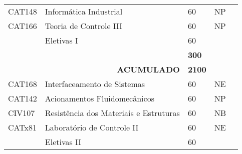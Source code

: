 \begin{table}[]
{\begin{tabular}{l|l|l|l|l}
			\multicolumn{1}{|l|}{CAT148}                        & Informática Industrial                                   & 60                                                           & NP                      &  \\ \cline{1-4}
			\multicolumn{1}{|l|}{CAT166}                        & Teoria de Controle III                                   & 60                                                           & NP                      &  \\ \cline{1-4}
			\multicolumn{1}{|l|}{{\color[HTML]{009901} }}       & {\color[HTML]{009901} Eletivas I}                        & {\color[HTML]{009901} 60}                                    & {\color[HTML]{009901} } &  \\ \cline{1-4}
			\multicolumn{1}{|l|}{}                              &                                                          & \textbf{300}                                                 &                         &  \\ \cline{1-4}
			\multicolumn{1}{|l|}{}                              & \multicolumn{1}{r|}{\textbf{ACUMULADO}}                  & \textbf{2100}                                                &                         &  \\ \cline{1-4}
			\multicolumn{1}{|l|}{CAT168}                        & Interfaceamento de Sistemas                              & 60                                                           & NE                      &  \\ \cline{1-4}
			\multicolumn{1}{|l|}{CAT142}                        & Acionamentos Fluidomecânicos                             & 60                                                           & NP                      &  \\ \cline{1-4}
			\multicolumn{1}{|l|}{CIV107}                        & Resistência dos Materiais e Estruturas                   & 60                                                           & NB                      &  \\ \cline{1-4}
			\multicolumn{1}{|l|}{CATx81}                        & Laboratório de Controle II                               & 60                                                           & NE                      &  \\ \cline{1-4}
			\multicolumn{1}{|l|}{}                              & {\color[HTML]{009901} Eletivas II}                       & {\color[HTML]{009901} 60}                                    & {\color[HTML]{009901} } &  \\ \cline{1-4}

\end{tabular}}
\end{table}
